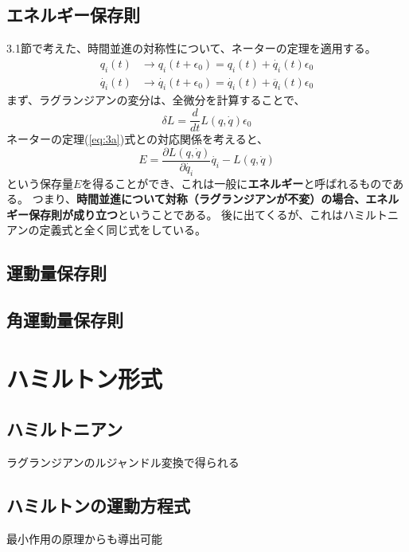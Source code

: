 \documentclass[a4paper]{jsreport}
\begin{document}
        \section{エネルギー保存則}
            3.1節で考えた、時間並進の対称性について、ネーターの定理を適用する。
            \begin{align}
                q_i(t) &\to q_i(t + \epsilon_0) = q_i(t) + \dot{q_i}(t)\epsilon_0 \\
                \dot{q_i}(t) &\to \dot{q_i}(t + \epsilon_0) = \dot{q_i}(t) + \ddot{q_i}(t)\epsilon_0
            \end{align}
            まず、ラグランジアンの変分は、全微分を計算することで、
            \begin{equation}
                \delta L = \frac{d}{dt} L(q, \dot{q})\epsilon_0
            \end{equation}
            ネーターの定理(\ref{eq:3a})式との対応関係を考えると、
            \begin{equation}
                E = \frac{\partial L(q, \dot{q})}{\partial \dot{q_i}} \dot{q_i} - L(q, \dot{q})
            \end{equation}
            という保存量$E$を得ることができ、これは一般に\textbf{エネルギー}と呼ばれるものである。
            つまり、\textbf{時間並進について対称（ラグランジアンが不変）の場合、エネルギー保存則が成り立つ}ということである。
            後に出てくるが、これはハミルトニアンの定義式と全く同じ式をしている。


        \section{運動量保存則}
        \section{角運動量保存則}

    \chapter{ハミルトン形式}
        \section{ハミルトニアン}
        ラグランジアンのルジャンドル変換で得られる
        \section{ハミルトンの運動方程式}
        最小作用の原理からも導出可能
\end{document}
